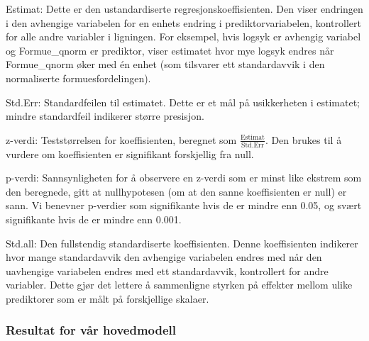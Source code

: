 \documentclass[
  12pt,
  a4paper,
  DIV=11,
  numbers=noendperiod]{scrartcl}
\begin{document}
Estimat: Dette er den ustandardiserte regresjonskoeffisienten. Den viser
endringen i den avhengige variabelen for en enhets endring i
prediktorvariabelen, kontrollert for alle andre variabler i ligningen.
For eksempel, hvis logsyk er avhengig variabel og Formue\_qnorm er
prediktor, viser estimatet hvor mye logsyk endres når Formue\_qnorm øker
med én enhet (som tilsvarer ett standardavvik i den normaliserte
formuesfordelingen).

Std.Err: Standardfeilen til estimatet. Dette er et mål på usikkerheten i
estimatet; mindre standardfeil indikerer større presisjon.

z-verdi: Teststørrelsen for koeffisienten, beregnet som
\(\frac{\text{Estimat}}{\text{Std.Err}}\). Den brukes til å vurdere om
koeffisienten er signifikant forskjellig fra null.

p-verdi: Sannsynligheten for å observere en z-verdi som er minst like
ekstrem som den beregnede, gitt at nullhypotesen (om at den sanne
koeffisienten er null) er sann. Vi benevner p-verdier som signifikante
hvis de er mindre enn 0.05, og svært signifikante hvis de er mindre enn
0.001.

Std.all: Den fullstendig standardiserte koeffisienten. Denne
koeffisienten indikerer hvor mange standardavvik den avhengige
variabelen endres med når den uavhengige variabelen endres med ett
standardavvik, kontrollert for andre variabler. Dette gjør det lettere å
sammenligne styrken på effekter mellom ulike prediktorer som er målt på
forskjellige skalaer.

\subsubsection{Resultat for vår
hovedmodell}\label{resultat-for-vuxe5r-hovedmodell}
\end{document}
